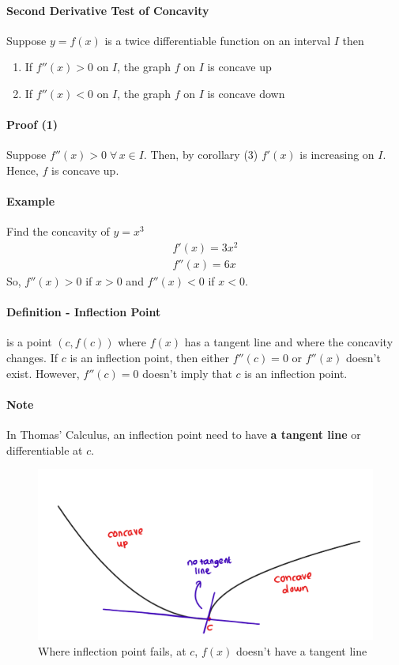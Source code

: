 \documentclass[12pt]{article}
\begin{document}
\paragraph{Second Derivative Test of Concavity}
Suppose $y = f(x)$ is a twice differentiable function on an interval $I$ then
\begin{enumerate} 
     \item If $f''(x) > 0$ on $I$, the graph $f$ on $I$ is concave up 
     \item If $f''(x) < 0$ on $I$, the graph $f$ on $I$ is concave down
\end{enumerate}
\paragraph{Proof (1)}
Suppose $f''(x) > 0 \; \forall \, x \in I$. Then, by corollary (3) $f'(x)$ is increasing on $I$. Hence, $f$ is concave up.
\paragraph{Example} Find the concavity of $y = x^3$ 
\begin{align*} 
     f'(x) = 3x^2 \\
     f''(x) = 6x 
\end{align*}
So, $f''(x) > 0$ if $x > 0$ and $f''(x) < 0$ if $x < 0$.

\paragraph{Definition - Inflection Point} is a point $(c, f(c))$ where $f(x)$ has a tangent line and where the concavity changes.
If $c$ is an inflection point, then either $f''(c) = 0$ or $f''(x)$ doesn't exist. However, $f''(c) = 0$ doesn't imply that $c$ is an inflection point.
\paragraph{Note} In Thomas' Calculus, an inflection point need to have \textbf{a tangent line} or differentiable at $c$.
\begin{figure}[h!]
    \centering
    \includegraphics[width = 0.6\linewidth]{Images/inflection fail.png}
    \caption{Where inflection point fails, at $c$, $f(x)$ doesn't have a tangent line}
\end{figure}
\end{document}
